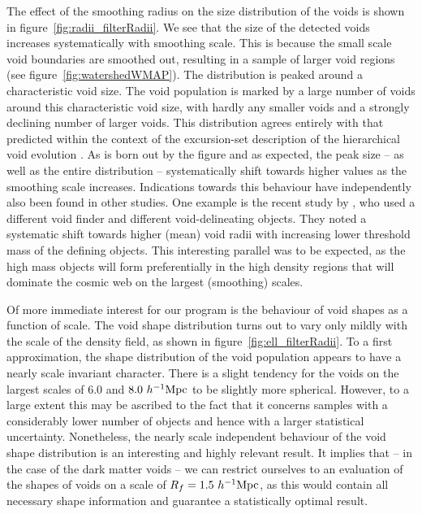 The effect of the smoothing radius on the size distribution of the voids is shown in figure~\ref{fig:radii_filterRadii}.
We see that the size of the detected voids increases systematically with smoothing scale. 
This is because the small scale void boundaries are smoothed out, resulting in a sample of larger void regions 
(see figure~\ref{fig:watershedWMAP}). The distribution is peaked around a characteristic void size. The void 
population is marked by a large number of voids around this characteristic void size, with hardly any smaller voids and 
a strongly declining number of larger voids. This distribution agrees entirely with that predicted within the context of 
the excursion-set description of the hierarchical void evolution \citep{sheth04}. As is born out by the figure and as 
expected, the peak size -- as well as the entire distribution -- systematically shift towards higher values as the smoothing 
scale increases.
Indications towards this behaviour have independently also been found in other studies. One example is the 
recent study by \citet{einasto11}, who used a different void finder and different void-delineating objects. They noted 
a systematic shift towards higher (mean) void radii with increasing lower threshold mass of the defining objects. This 
interesting parallel was to be expected, as the high mass objects will form preferentially in the high density regions 
that will dominate the cosmic web on the largest (smoothing) scales.

Of more immediate interest for our program is the behaviour of void shapes as a function of scale. 
The void shape distribution turns out to vary only mildly with the scale of the density field, as shown in figure~\ref{fig:ell_filterRadii}.
To a first approximation, the shape distribution of the void population appears to have a nearly scale invariant
character. There is a slight tendency for the voids on the largest scales of 
$6.0$ and $8.0~h^{-1} {\rm Mpc}$ to be slightly more spherical. However, to a large extent this may be ascribed to the 
fact that it concerns samples with a considerably lower number of objects and hence with a larger statistical 
uncertainty. Nonetheless, the nearly scale independent behaviour of the void shape distribution is an 
interesting and highly relevant result. It implies that -- in the case of the dark matter voids -- we can restrict 
ourselves to an evaluation of the shapes of voids on a scale of $R_f = 1.5 ~h^{-1} {\rm Mpc}$, as this would contain 
all necessary shape information and guarantee a statistically optimal result.

